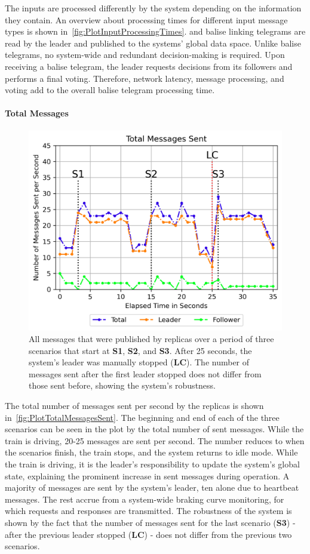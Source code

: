 The inputs are processed differently by the system depending on the information they contain.
An overview about processing times for different input message types is shown in~\autoref{fig:PlotInputProcessingTimes}.
 and balise linking telegrams are read by the leader and published to the systems' global data space.
Unlike balise telegrams, no system-wide and redundant decision-making is required.
Upon receiving a balise telegram, the leader requests decisions from its followers and performs a final voting.
Therefore, network latency, message processing, and voting add to the overall balise telegram processing time.

\paragraph{Total Messages}

\begin{figure}[!hb]
	\centering
	\includegraphics[width=0.8\linewidth]{images/plots/TotalMessagesSent}
	\caption{All messages that were published by replicas over a period of three scenarios that start at \textbf{S1}, \textbf{S2}, and \textbf{S3}. After 25 seconds, the system's leader was manually stopped (\textbf{LC}). The number of messages sent after the first leader stopped does not differ from those sent before, showing the system's robustness.}
	\label{fig:PlotTotalMessagesSent}
\end{figure}

The total number of messages sent per second by the replicas is shown in~\autoref{fig:PlotTotalMessagesSent}.
The beginning and end of each of the three scenarios can be seen in the plot by the total number of sent messages.
While the train is driving, 20-25 messages are sent per second.
The number reduces to when the scenarios finish, the train stops, and the system returns to idle mode.
While the train is driving, it is the leader's responsibility to update the system's global state, explaining the prominent increase in sent messages during operation.
A majority of messages are sent by the system's leader, ten alone due to heartbeat messages.
The rest accrue from a system-wide braking curve monitoring, for which requests and responses are transmitted.
The robustness of the system is shown by the fact that the number of messages sent for the last scenario (\textbf{S3}) - after the previous leader stopped (\textbf{LC}) - does not differ from the previous two scenarios.

